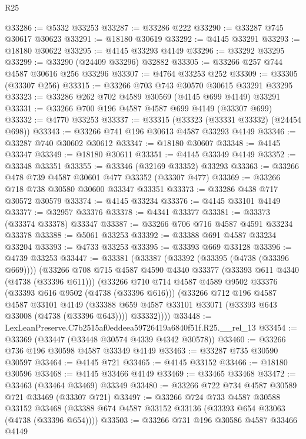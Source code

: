 \begin{lexlean}{R25}
\begin{coremodule}
@33286 := @5332 @33253
@33287 := @33286 @222
@33290 := @33287 @745 @30617 @30623
@33291 := @18180 @30619
@33292 := @4145 @33291
@33293 := @18180 @30622
@33295 := @4145 @33293 @4149
@33296 := @33292 @33295
@33299 := @33290 (@24409 @33296) @32882
@33305 := @33266 @257 @744 @4587 @30616 @256 @33296
@33307 := @4764 @33253 @252
@33309 := @33305 (@33307 @256)
@33315 := @33266 @703 @743 @30570 @30615 @33291 @33295
@33323 := @33286 @262 @702 @4589 @30569 (@4145 @699 @4149) @33291
@33331 := @33266 @700 @196 @4587 @4587 @699 @4149 (@33307 @699)
@33332 := @4770 @33253
@33337 := @33315 (@33323 (@33331 @33332) (@24454 @698))
@33343 := @33266 @741 @196 @30613 @4587 @33293 @4149
@33346 := @33287 @740 @30602 @30612
@33347 := @18180 @30607
@33348 := @4145 @33347
@33349 := @18180 @30611
@33351 := @4145 @33349 @4149
@33352 := @33348 @33351
@33355 := @33346 (@32169 @33352) @33293
@33363 := @33266 @478 @739 @4587 @30601 @477 @33352 (@33307 @477)
@33369 := @33266 @718 @738 @30580 @30600 @33347 @33351
@33373 := @33286 @438 @717 @30572 @30579
@33374 := @4145 @33234
@33376 := @4145 @33101 @4149
@33377 := @32957 @33376
@33378 := @4341 @33377
@33381 := @33373 (@33374 @33378) @33347
@33387 := @33266 @706 @716 @4587 @4591 @33234 @33378
@33388 := @5061 @33253
@33392 := @33388 @691 @4587 @33234 @33204
@33393 := @4733 @33253
@33395 := @33393 @669 @33128
@33396 := @4739 @33253
@33447 := @33381
    (@33387
      (@33392 (@33395 (@4738 (@33396 @669))))
      (@33266
        @708
        @715
        @4587
        @4590
        @4340
        @33377
        (@33393 @611 @4340 (@4738 (@33396 @611)))
        (@33266
          @710
          @714
          @4587
          @4589
          @9502
          @33376
          (@33393 @616 @9502 (@4738 (@33396 @616)))
          (@33266
            @712
            @196
            @4587
            @4587
            @33101
            @4149
            (@33388 @659 @4587 @33101 @33071 (@33393 @643 @33008 (@4738 (@33396 @643))))
            @33332))))
@33448 := LexLeanPreserve.C7b2515af0eddeea59726419a6840f51f.R25.__rel_13
@33454 := @33369 (@33447 (@33448 @30574 @4339 @4342 @30578))
@33460 := @33266 @736 @196 @30598 @4587 @33349 @4149
@33463 := @33287 @735 @30590 @30597
@33464 := @4145 @721
@33465 := @4145 @33152
@33466 := @18180 @30596
@33468 := @4145 @33466 @4149
@33469 := @33465 @33468
@33472 := @33463 (@33464 @33469) @33349
@33480 := @33266 @722 @734 @4587 @30589 @721 @33469 (@33307 @721)
@33497 := @33266
    @724
    @733
    @4587
    @30588
    @33152
    @33468
    (@33388 @674 @4587 @33152 @33136 (@33393 @654 @33063 (@4738 (@33396 @654))))
@33503 := @33266 @731 @196 @30586 @4587 @33466 @4149

\end{coremodule}
\end{lexlean}
